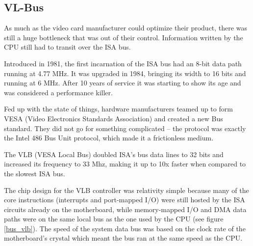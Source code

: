 \subsection{VL-Bus}
As much as the video card manufacturer could optimize their product, there was still a huge bottleneck that was out of their control. Information written by the CPU still had to transit over the ISA bus.\\
\par
 Introduced in 1981, the first incarnation of the ISA bus had an 8-bit data path running at 4.77 MHz. It was upgraded in 1984, bringing its width to 16 bits and running at 6 MHz. After 10 years of service it was starting to show its age and was considered a performance killer.\\
\par
{}
\par
Fed up with the state of things, hardware manufacturers teamed up to form VESA (Video Electronics Standards Association) and created a new Bus standard. They did not go for something complicated -- the protocol was exactly the Intel 486 Bus Unit protocol, which made it a frictionless medium.\\
\par 
The VLB (VESA Local Bus) doubled ISA's bus data lines to 32 bits and increased its frequency to 33 Mhz, making it up to 10x faster when compared to the slowest ISA bus.\\
\par
The chip design for the VLB controller was relativity simple because many of the core instructions (interrupts and port-mapped I/O) were still hosted by the ISA circuits already on the motherboard, while memory-mapped I/O and DMA data paths were on the same local bus as the one used by the CPU (see figure \ref{bus_vlb}). The speed of the system data bus was based on the clock rate of the motherboard's crystal which meant the bus ran at the same speed as the CPU.\\
\par
{}
\label{vlbarchitecture}

